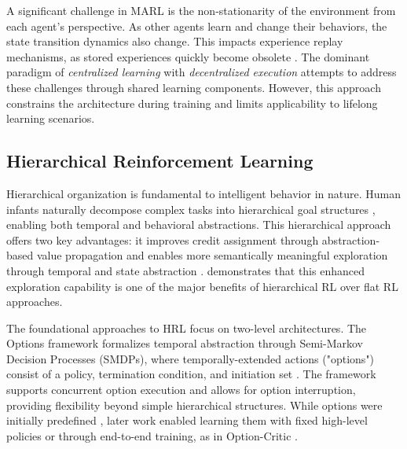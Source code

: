 
A significant challenge in MARL is the non-stationarity of the environment from each agent's perspective. As other agents learn and change their behaviors, the state transition dynamics also change. This impacts experience replay mechanisms, as stored experiences quickly become obsolete \citep{Foerster2016}. The dominant paradigm of \emph{centralized learning} with \emph{decentralized execution} \citep{Oroojlooy2023} attempts to address these challenges through shared learning components. However, this approach constrains the architecture during training and limits applicability to lifelong learning scenarios.


\subsection{Hierarchical Reinforcement Learning}
\vspace{0.1in}
\label{sec:hrl}

Hierarchical organization is fundamental to intelligent behavior in nature. Human infants naturally decompose complex tasks into hierarchical goal structures \citep{Spelke2007}, enabling both temporal and behavioral abstractions. This hierarchical approach offers two key advantages: it improves credit assignment through abstraction-based value propagation and enables more semantically meaningful exploration through temporal and state abstraction \citep{Hutsebaut2022}. \citet{Nachum2019} demonstrates that this enhanced exploration capability is one of the major benefits of hierarchical RL over flat RL approaches.

The foundational approaches to HRL focus on two-level architectures. The Options framework formalizes temporal abstraction through Semi-Markov Decision Processes (SMDPs), where temporally-extended actions ("options") consist of a policy, termination condition, and initiation set \citep{Sutton1999}. The framework supports concurrent option execution and allows for option interruption, providing flexibility beyond simple hierarchical structures. While options were initially predefined \citep{Sutton1999}, later work enabled learning them with fixed high-level policies \citep{Silver2012, Mann2014} or through end-to-end training, as in Option-Critic \citep{Bacon2017}.

